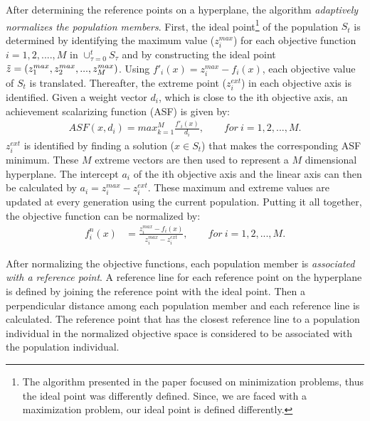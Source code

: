 After determining the reference points on a hyperplane, the algorithm \textit{adaptively normalizes the population members}. First, the ideal point\footnote{The algorithm presented in the paper focused on minimization problems, thus the ideal point was differently defined. Since, we are faced with a maximization problem, our ideal point is defined differently.} of the population $S_t$ is determined by identifying the maximum value ($z_i^{max}$) for each objective function $i = 1, 2,...., M$ in $\cup_{\tau=0}^{t} S_\tau$ and by constructing the ideal point $\Tilde{z} = (z_1^{max}, z_2^{max},..., z_M^{max})$. Using $f'_i(x) = z_i^{max} - f_i(x)$, each objective value of $S_t$ is translated. Thereafter, the extreme point ($z_i^{ext}$) in each objective axis is identified. Given  a weight vector $d_i$, which is close to the ith objective axis, an achievement scalarizing function (ASF) is given by:
\begin{align*}
    ASF(x, d_i) = max_{k=1}^M \frac{f'_i(x)}{d_i}, \qquad for\ i = 1, 2,...,M. 
\end{align*}
$z_i^{ext}$ is identified by finding a solution ($x \in S_t$) that makes the corresponding ASF minimum. These $M$ extreme vectors are then used to represent a $M$ dimensional hyperplane. The intercept $a_i$ of the ith objective axis and the linear axis can then be calculated by $a_i = z_i^{max} - z_i^{ext}$. These maximum and extreme values are
updated at every generation using the current population. Putting it all together, the objective function can be normalized by:
\begin{align}
    f_i^n(x) &=  \frac{z_i^{max} - f_i(x)}{z_i^{max} - z_i^{ext}}, \qquad for\ i = 1, 2,...,M. \label{eq:41a}  
\end{align}

After normalizing the objective functions, each population member is \textit{associated with a reference point}. A reference line for each reference point on the hyperplane is defined by joining the reference point with the ideal point. Then a perpendicular distance among each population member and each reference line is calculated. The reference point that has the closest reference line to a population individual in the normalized objective space is considered to be associated with the population individual.


